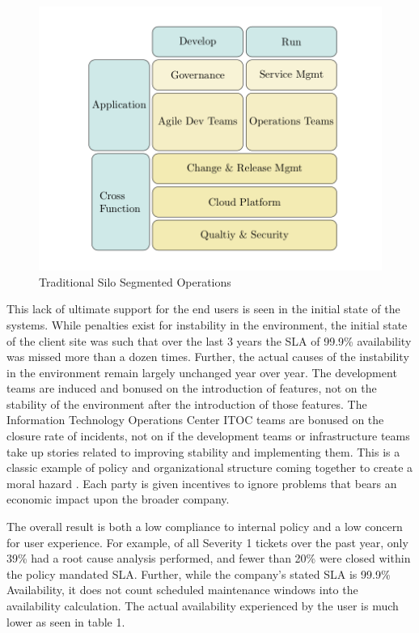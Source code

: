 \documentclass[doc]{apa7}
\begin{document}
\begin{figure}[htbp]
\centering
\includegraphics[width=.9\linewidth]{./diag2.png}
\caption{Traditional Silo Segmented Operations}
\end{figure}


This lack of ultimate support for the end users is seen in the initial state of the systems. While penalties exist for instability in the environment, the initial state of the client site was such that over the last 3 years the SLA of 99.9\% availability was missed more than a dozen times. Further, the actual causes of the instability in the environment remain largely unchanged year over year. The development teams are induced and bonused on the introduction of features, not on the stability of the environment after the introduction of those features. The Information Technology Operations Center ITOC teams are bonused on the closure rate of incidents, not on if the development teams or infrastructure teams take up stories related to improving stability and implementing them. This is a classic example of policy and organizational structure coming together to create a moral hazard \citep{depersioWhatAreExamples}. Each party is given incentives to ignore problems that bears an economic impact upon the broader company.

The overall result is both a low compliance to internal policy and a low concern for user experience. For example, of all Severity 1 tickets over the past year, only 39\% had a root cause analysis performed, and fewer than 20\% were closed within the policy mandated SLA. Further, while the company's stated SLA is 99.9\% Availability, it does not count scheduled maintenance windows into the availability calculation. The actual availability experienced by the user is much lower as seen in table 1.
\end{document}
